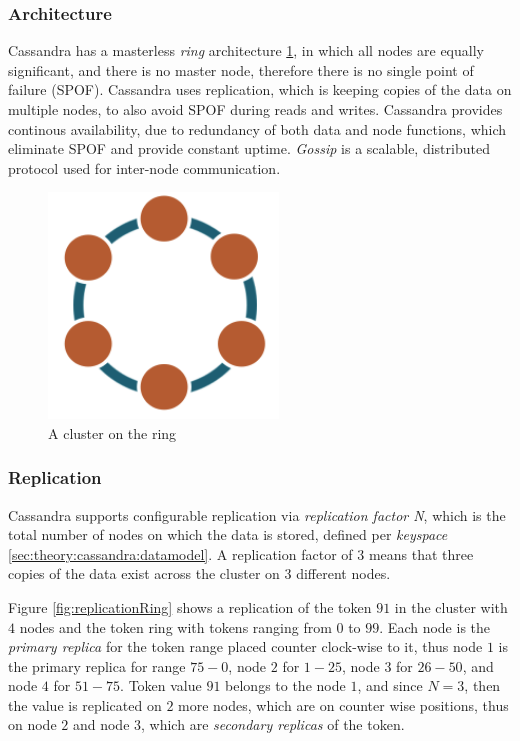 \subsubsection{Architecture}
Cassandra has a masterless \emph{ring} architecture \ref{fig:archCluster}, in which all nodes are equally significant, and there is no master node, therefore there is no single point of failure (SPOF). Cassandra uses replication, which is keeping copies of the data on multiple nodes, to also avoid SPOF during reads and writes. Cassandra provides continous availability, due to redundancy of both data and node functions, which eliminate SPOF and provide constant uptime.
\emph{Gossip} is a scalable, distributed protocol used for inter-node communication.

\begin{figure}[h]
	\centering
	\includegraphics[height=60mm]{images/cassandra-ring.png}\hspace{10mm}
	\caption{A cluster on the ring}
	\label{fig:archCluster}
\end{figure}

\subsubsection{Replication}
Cassandra supports configurable replication via \emph{replication factor N}, which is the total number of nodes on which the data is stored, defined per \emph{keyspace} \ref{sec:theory:cassandra:datamodel}. A replication factor of $3$ means that three copies of the data exist across the cluster on $3$ different nodes.

Figure \ref{fig:replicationRing} shows a replication of the token $91$ in the cluster with $4$ nodes and the token ring with tokens ranging from $0$ to $99$. 
Each node is the \emph{primary replica} for the token range placed counter clock-wise to it, thus node $1$ is the primary replica for range $75-0$, node $2$ for $1-25$, node $3$ for $26-50$, and node $4$ for $51-75$. 
Token value $91$ belongs to the node $1$, and since $N=3$, then the value is replicated on $2$ more nodes, which are on counter wise positions, thus on node $2$ and node $3$, which are \emph{secondary replicas} of the token. 

